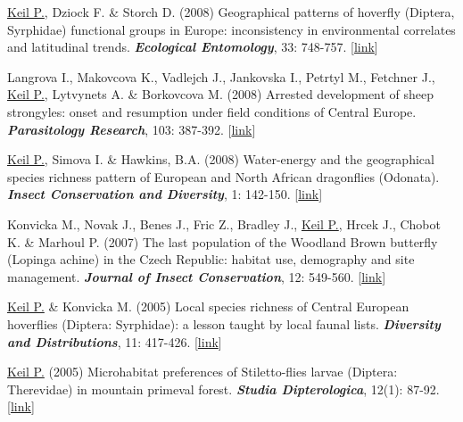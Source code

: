 \begin{etaremune}
\item \underline{Keil P.}, Dziock F. \& Storch D. (2008) Geographical patterns of hoverfly (Diptera, Syrphidae) functional groups in Europe: inconsistency in environmental correlates and latitudinal trends. \textit{\textbf{Ecological Entomology}}, 33: 748-757. [\href{http://onlinelibrary.wiley.com/doi/10.1111/j.1365-2311.2008.01032.x/abstract}{link}]

\item Langrova I., Makovcova K., Vadlejch J., Jankovska I., Petrtyl M., Fetchner J., \underline{Keil P.}, Lytvynets A. \& Borkovcova M. (2008) Arrested development of sheep strongyles: onset and resumption under field conditions of Central Europe. \textit{\textbf{Parasitology Research}}, 103: 387-392. [\href{http://link.springer.com/article/10.1007%2Fs00436-008-0984-6}{link}]

\item \underline{Keil P.}, Simova I. \& Hawkins, B.A. (2008) Water-energy and the geographical species richness pattern of European and North African dragonflies (Odonata). \textit{\textbf{Insect Conservation and Diversity}}, 1: 142-150. [\href{http://onlinelibrary.wiley.com/doi/10.1111/j.1752-4598.2008.00019.x/abstract}{link}]

\item Konvicka M., Novak J., Benes J., Fric Z., Bradley J., \underline{Keil P.}, Hrcek J., Chobot K. \& Marhoul P. (2007) The last population of the Woodland Brown butterfly (Lopinga achine) in the Czech Republic: habitat use, demography and site management. \textit{\textbf{Journal of Insect Conservation}}, 12: 549-560. [\href{http://link.springer.com/article/10.1007%2Fs10841-007-9087-4}{link}]

\item \underline{Keil P.} \& Konvicka M. (2005) Local species richness of Central European hoverflies (Diptera: Syrphidae): a lesson taught by local faunal lists. \textit{\textbf{Diversity and Distributions}}, 11: 417-426. [\href{http://onlinelibrary.wiley.com/doi/10.1111/j.1366-9516.2005.00172.x/abstract}{link}]

\item \underline{Keil P.} (2005) Microhabitat preferences of Stiletto-flies larvae (Diptera: Therevidae) in mountain primeval forest. \textit{\textbf{Studia Dipterologica}}, 12(1): 87-92. [\href{http://www.studia-dipt.de/con121.htm}{link}]
\end{etaremune}

\HRule


